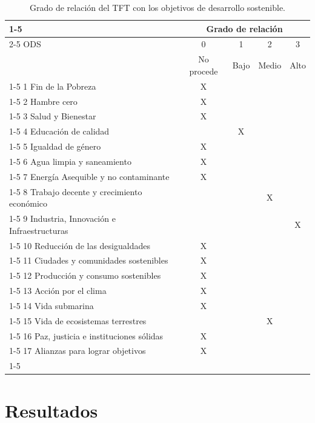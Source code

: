 \documentclass[oneside,12pt]{book}
\begin{document}
\begin{table}[!htbp]
\caption{Grado de relación del TFT con los objetivos de desarrollo sostenible.}
\label{tab:ODS}
\centering
\begin{tabular}{|l|c|c|c|c|}
\cline{1-5}
  & \multicolumn{4}{c|}{Grado de relación} \\ \cline{2-5} 
 ODS & 0 & 1 & 2 & 3 \\
  & No procede & Bajo & Medio & Alto \\  
  \cline{1-5} 
1 Fin de la Pobreza & X & & & \\ \cline{1-5}
2 Hambre cero & X & & & \\
\cline{1-5}
3 Salud y Bienestar & X & & & \\
\cline{1-5}
4 Educación de calidad & & X & & \\
\cline{1-5}
5 Igualdad de género & X & & & \\
\cline{1-5}
6 Agua limpia y saneamiento & X & & & \\
\cline{1-5}
7 Energía Asequible y no contaminante & X & & & \\
\cline{1-5}
8 Trabajo decente y crecimiento económico & & & X & \\
\cline{1-5}
9 Industria, Innovación e Infraestructuras & & & & X \\
\cline{1-5}
10 Reducción de las desigualdades & X & & & \\
\cline{1-5}
11 Ciudades y comunidades sostenibles & X & & & \\
\cline{1-5}
12 Producción y consumo sostenibles & X & & & \\
\cline{1-5} 
13 Acción por el clima & X & & & \\
\cline{1-5}
14 Vida submarina & X & & & \\
\cline{1-5}
15 Vida de ecosistemas terrestres & & & X & \\
\cline{1-5}
16 Paz, justicia e instituciones sólidas & X & & & \\
\cline{1-5}
17 Alianzas para lograr objetivos & X & & & \\
\cline{1-5}
\end{tabular}%
\end{table}








\chapter{Resultados}
%
\end{document}
